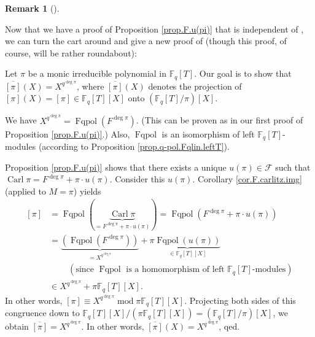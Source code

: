 \documentclass[numbers=enddot,12pt,final,onecolumn,notitlepage]{scrartcl}%
\theoremstyle{definition}
\newtheorem{remk}[theo]{Remark}
\newenvironment{remark}[1][]
{\begin{remk}[#1]\begin{leftbar}}
{\end{leftbar}\end{remk}}
\begin{document}
\begin{remark}
Now that we have a proof of Proposition \ref{prop.F.u(pi)} that is independent
of \cite[Theorem 2.11]{kc-carlitz}, we can turn the cart around and give a new
proof of \cite[Theorem 2.11, last equality]{kc-carlitz} (though this proof, of
course, will be rather roundabout):

Let $\pi$ be a monic irreducible polynomial in $\mathbb{F}_{q}\left[
T\right]  $. Our goal is to show that $\overline{\left[  \pi\right]  }\left(
X\right)  =X^{q^{\deg\pi}}$, where $\overline{\left[  \pi\right]  }\left(
X\right)  $ denotes the projection of $\left[  \pi\right]  \left(  X\right)
=\left[  \pi\right]  \in\mathbb{F}_{q}\left[  T\right]  \left[  X\right]  $
onto $\left(  \mathbb{F}_{q}\left[  T\right]  /\pi\right)  \left[  X\right]  $.

We have $X^{q^{\deg\pi}}=\operatorname*{Fqpol}\left(  F^{\deg\pi}\right)  $.
(This can be proven as in our first proof of Proposition \ref{prop.F.u(pi)}.)
Also, $\operatorname*{Fqpol}$ is an isomorphism of left $\mathbb{F}_{q}\left[
T\right]  $-modules (according to Proposition \ref{prop.q-pol.Fqlin.leftT}).

Proposition \ref{prop.F.u(pi)} shows that there exists a unique $u\left(
\pi\right)  \in\mathcal{F}$ such that $\operatorname*{Carl}\pi=F^{\deg\pi}%
+\pi\cdot u\left(  \pi\right)  $. Consider this $u\left(  \pi\right)  $.
Corollary \ref{cor.F.carlitz.img} (applied to $M=\pi$) yields
\begin{align*}
\left[  \pi\right]   &  =\operatorname*{Fqpol}\left(
\underbrace{\operatorname*{Carl}\pi}_{=F^{\deg\pi}+\pi\cdot u\left(
\pi\right)  }\right)  =\operatorname*{Fqpol}\left(  F^{\deg\pi}+\pi\cdot
u\left(  \pi\right)  \right)  \\
&  =\underbrace{\left(  \operatorname*{Fqpol}\left(  F^{\deg\pi}\right)
\right)  }_{=X^{q^{\deg\pi}}}+\pi\underbrace{\operatorname*{Fqpol}\left(
u\left(  \pi\right)  \right)  }_{\in\mathbb{F}_{q}\left[  T\right]  \left[
X\right]  }\\
&  \ \ \ \ \ \ \ \ \ \ \left(  \text{since }\operatorname*{Fqpol}\text{ is a
homomorphism of left }\mathbb{F}_{q}\left[  T\right]  \text{-modules}\right)
\\
&  \in X^{q^{\deg\pi}}+\pi\mathbb{F}_{q}\left[  T\right]  \left[  X\right]  .
\end{align*}
In other words, $\left[  \pi\right]  \equiv X^{q^{\deg\pi}}\operatorname{mod}%
\pi\mathbb{F}_{q}\left[  T\right]  \left[  X\right]  $. Projecting both sides
of this congruence down to $\mathbb{F}_{q}\left[  T\right]  \left[  X\right]
/\left(  \pi\mathbb{F}_{q}\left[  T\right]  \left[  X\right]  \right)
=\left(  \mathbb{F}_{q}\left[  T\right]  /\pi\right)  \left[  X\right]  $, we
obtain $\overline{\left[  \pi\right]  }=X^{q^{\deg\pi}}$. In other words,
$\overline{\left[  \pi\right]  }\left(  X\right)  =X^{q^{\deg\pi}}$, qed.
\end{remark}
\end{document}
